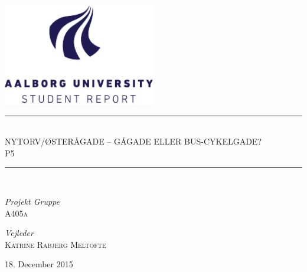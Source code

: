 %
%
%
%
%
\begin{titlepage}
	\begin{center}
		\newcommand{\HRule}{\rule{\linewidth}{0.5mm}}
		
		\includegraphics[width=0.5\textwidth]{figures/aau_logo_en.pdf}~\\[1cm]
		
		
		
		\HRule \\[0.4cm]
		{ \huge NYTORV/ØSTERÅGADE – GÅGADE ELLER BUS-CYKELGADE?\\[0.4cm]
			\large \textsc{P5}}
		
		\HRule \\[1.5cm]
		
		\begin{minipage}{0.4\textwidth}
			\begin{flushleft} \large
				\emph{Projekt Gruppe}\\
				\textsc{A405a}
			\end{flushleft}
		\end{minipage}
		\begin{minipage}{0.4\textwidth}
			\begin{flushright} \large
				\emph{Vejleder} \\
				\textsc{Katrine Rabjerg Meltofte}
			\end{flushright}
		\end{minipage}
		
		\vfill
		
		{\large 18. December 2015}
		
	\end{center}
\end{titlepage}

\clearpage

